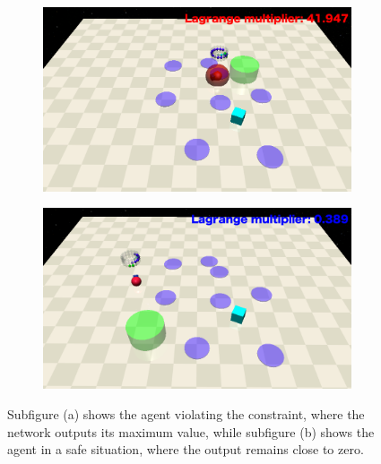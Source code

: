 \begin{figure}[H]
    \centering
    \begin{subfigure}{0.48\textwidth}
        \centering
        \includegraphics[width=\linewidth]{figure/test/unsafe.png}
        \caption{}
    \end{subfigure}
    \hfill
    \begin{subfigure}{0.49\textwidth}
        \centering
        \includegraphics[width=\linewidth]{figure/test/safe.png}
        \caption{}
    \end{subfigure}
    \caption{%
            Subfigure (a) shows the agent violating the constraint, where the network outputs its maximum value, 
            while subfigure (b) shows the agent in a safe situation, where the output remains close to zero.}
    \label{fig:point_goal_test_results_bc}
\end{figure}

